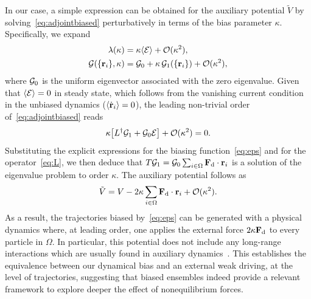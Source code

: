 \documentclass[pre, superscriptaddress, twocolumn,pre]{revtex4-1}
\begin{document}
In our case, a simple expression can be obtained for the auxiliary potential $\tilde V$ by solving~\eqref{eq:adjointbiased} perturbatively in terms of the bias parameter $\kappa$. Specifically, we expand
\begin{equation}
	\begin{aligned}
		\lambda(\kappa) &= \kappa \langle{\cal E}\rangle + {\cal O}(\kappa^2) ,
		\\
		{\cal G}(\{{\bf r}_i\},\kappa) &= {\cal G}_0 + \kappa\,{\cal G}_1(\{{\bf r}_i\}) + {\cal O}(\kappa^2) ,
	\end{aligned}
\end{equation}
where ${\cal G}_0$ is the uniform eigenvector associated with the zero eigenvalue. Given that $\langle{\cal E}\rangle=0$ in steady state, which follows from the vanishing current condition in the unbiased dynamics ($\langle\dot{\bf r}_i\rangle=0$), the leading non-trivial order of~\eqref{eq:adjointbiased} reads
\begin{equation}
	\kappa\big[L^\dagger{\cal G}_1 + {\cal G}_0 {\cal E}\big] + {\cal O}(\kappa^2) = 0 .
\end{equation}
Substituting the explicit expressions for the biasing function~\eqref{eq:eps} and for the operator~\eqref{eq:L}, we then deduce that $T{\cal G}_1 = {\cal G}_0 \sum_{i\in\Omega}{\bf F}_{\rm d}\cdot{\bf r}_i$ is a solution of the eigenvalue problem to order $\kappa$. The auxiliary potential follows as
\begin{equation}\label{eq:V}
	\tilde V = V - 2\kappa \sum_{i\in\Omega} {\bf F}_{\rm d}\cdot{\bf r}_i + {\cal O}(\kappa^2) .
\end{equation}
As a result, the trajectories biased by~\eqref{eq:eps} can be generated with a physical dynamics where, at leading order, one applies the external force $2\kappa{\bf F}_{\rm d}$ to every particle in $\Omega$. In particular, this potential does not include any long-range interactions which are usually found in auxiliary dynamics~\cite{Jack2015}. This establishes the equivalence between our dynamical bias and an external weak driving, at the level of trajectories, suggesting that biased ensembles indeed provide a relevant framework to explore deeper the effect of nonequilibrium forces.
\end{document}
